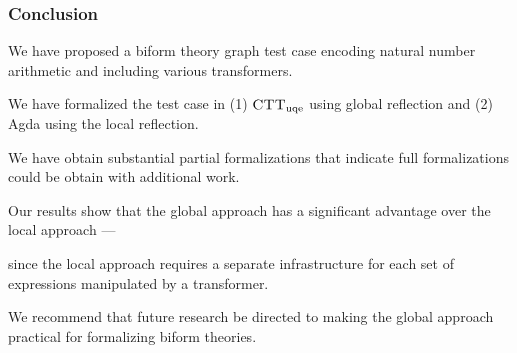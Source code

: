 \documentclass[t,12pt,numbers,fleqn]{beamer}
\newcommand{\churchuqe}{$\mbox{\sc CTT}_{\rm uqe}$}
\begin{document}
\begin{frame}
\frametitle{Conclusion}
\bi

  \item We have proposed a biform theory graph test case encoding
    natural number arithmetic and including various transformers.

\pause

  \item We have formalized the test case in (1) {\churchuqe} using 
    global reflection and (2) Agda using the local reflection.

  \bi

    \item We have obtain substantial partial formalizations that
      indicate full formalizations could be obtain with additional
      work.

  \ei

\pause

  \item Our results show that the global approach has a significant
    advantage over the local approach ---

  \bi

    \item[] since the local approach requires a separate
      infrastructure for each set of expressions manipulated by a
      transformer.
 
  \ei

\pause

  \item We recommend that future research be directed to making the
    global approach practical for formalizing biform theories.

\ei
\end{frame}

\end{document}
